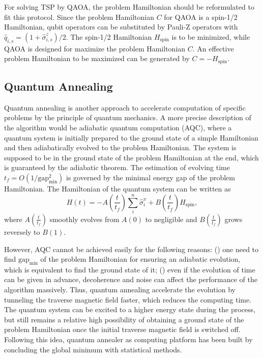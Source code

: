 \documentclass[aps,pra,twocolumn,superscriptaddress]{revtex4-2}
\begin{document}
For solving TSP by QAOA, the problem Hamiltonian should be reformulated to fit this protocol. Since the problem Hamiltonian $C$ for QAOA is a spin-1/2 Hamiltonian, qubit operators can be substituted by Pauli-Z operators with $\hat{q}_{i,s}=(1+\hat{\sigma}_{i,s}^z)/2$. The spin-1/2 Hamiltonian $H_{\text{spin}}$ is to be minimized, while QAOA is designed for maximize the problem Hamiltonian $C$. An effective problem Hamiltonian to be maximized can be generated by $C=-H_{\text{spin}}$.

\subsection{Quantum Annealing}
Quantum annealing is another approach to accelerate computation of specific problems by the principle of quantum mechanics. A more precise description of the algorithm would be adiabatic quantum computation (AQC), where a quantum system is initially prepared to the ground state of a simple Hamiltonian and then adiabatically evolved to the problem Hamiltonian. The system is supposed to be in the ground state of the problem Hamiltonian at the end, which is guaranteed by the adiabatic theorem. The estimation of evolving time $t_f=O(1/\text{gap}^2_{\min})$ is governed by the minimal energy gap of the problem Hamiltonian. The Hamiltonian of the quantum system can be written as
\begin{equation}
\label{eq:H_2D}
H(t)=-A(\frac{t}{t_f})\sum_i^n\hat{\sigma}_i^x+B(\frac{t}{t_f})H_{\text{spin}},
\end{equation}
where $A(\frac{t}{t_f})$ smoothly evolves from $A(0)$ to negligible and $B(\frac{t}{t_f})$ grows reversely to $B(1)$. 

However, AQC cannot be achieved easily for the following reasons: () one need to find $\text{gap}_{\min}$ of the problem Hamiltonian for ensuring an adiabatic evolution, which is equivalent to find the ground state of it; () even if the evolution of time can be given in advance, decoherence and noise can affect the performance of the algorithm massively. Thus, quantum annealing accelerate the evolution by tunneling the traverse magnetic field faster, which reduces the computing time. The quantum system can be excited to a higher energy state during the process, but still remains a relative high possibility of obtaining a ground state of the problem Hamiltonian once the initial traverse magnetic field is switched off. Following this idea, quantum annealer as computing platform has been built by concluding the global minimum with statistical methods.
\end{document}
